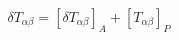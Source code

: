\begin{equation}
\delta T_{\alpha\beta}=\left[\delta T_{\alpha\beta}\right]_A
+\left[T_{\alpha\beta}\right]_P
\end{equation}

